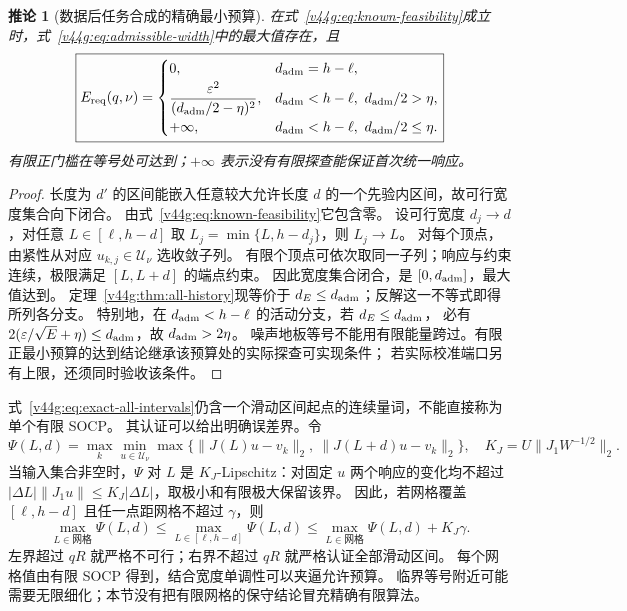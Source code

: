 \documentclass[11pt,a4paper]{article}
\numberwithin{equation}{section}
\newtheorem{corollary}[theorem]{推论}
\theoremstyle{definition}
\begin{document}
\begin{corollary}[数据后任务合成的精确最小预算]
\label{v44g:cor:energy}
在式~\eqref{v44g:eq:known-feasibility}成立时，式~\eqref{v44g:eq:admissible-width}中的最大值存在，且
\begin{equation}
 \boxed{
 E_{\rm req}(q,\nu)=
 \begin{cases}
 0,&d_{\rm adm}=h-\ell,\\[2pt]
 \displaystyle\frac{\varepsilon^2}{(d_{\rm adm}/2-\eta)^2},
   &d_{\rm adm}<h-\ell,\ d_{\rm adm}/2>\eta,\\[6pt]
 +\infty,&d_{\rm adm}<h-\ell,\ d_{\rm adm}/2\le\eta.
 \end{cases}}
 \label{v44g:eq:exact-energy}
\end{equation}
有限正门槛在等号处可达到；$+\infty$ 表示没有有限探查能保证首次统一响应。
\end{corollary}
\begin{proof}
长度为 $d'$ 的区间能嵌入任意较大允许长度 $d$ 的一个先验内区间，故可行宽度集合向下闭合。
由式~\eqref{v44g:eq:known-feasibility}它包含零。
设可行宽度 $d_j\to d$，对任意 $L\in[\ell,h-d]$ 取
$L_j=\min\{L,h-d_j\}$，则 $L_j\to L$。
对每个顶点，由紧性从对应 $u_{k,j}\in\mathcal U_\nu$ 选收敛子列。
有限个顶点可依次取同一子列；响应与约束连续，极限满足 $[L,L+d]$ 的端点约束。
因此宽度集合闭合，是 $[0,d_{\rm adm}]$，最大值达到。
定理~\ref{v44g:thm:all-history}现等价于 $d_E\le d_{\rm adm}$；反解这一不等式即得所列各分支。
特别地，在 $d_{\rm adm}<h-\ell$ 的活动分支，若 $d_E\le d_{\rm adm}$，
必有 $2(\varepsilon/\sqrt E+\eta)\le d_{\rm adm}$，故 $d_{\rm adm}>2\eta$。
噪声地板等号不能用有限能量跨过。有限正最小预算的达到结论继承该预算处的实际探查可实现条件；
若实际校准端口另有上限，还须同时验收该条件。
\end{proof}

式~\eqref{v44g:eq:exact-all-intervals}仍含一个滑动区间起点的连续量词，不能直接称为单个有限 SOCP。
其认证可以给出明确误差界。令
\begin{equation}
 \Psi(L,d)=\max_k\min_{u\in\mathcal U_\nu}
  \max\{\|J(L)u-v_k\|_2,\ \|J(L+d)u-v_k\|_2\},
 \quad K_J=U\|J_1W^{-1/2}\|_2.
 \label{v44g:eq:value-function}
\end{equation}
当输入集合非空时，$\Psi$ 对 $L$ 是 $K_J$-Lipschitz：对固定 $u$ 两个响应的变化均不超过
$|\Delta L|\|J_1u\|\le K_J|\Delta L|$，取极小和有限极大保留该界。
因此，若网格覆盖 $[\ell,h-d]$ 且任一点距网格不超过 $\gamma$，则
\begin{equation}
 \max_{L\in\text{网格}}\Psi(L,d)
 \le\max_{L\in[\ell,h-d]}\Psi(L,d)
 \le\max_{L\in\text{网格}}\Psi(L,d)+K_J\gamma.
 \label{v44g:eq:grid-certificate}
\end{equation}
左界超过 $qR$ 就严格不可行；右界不超过 $qR$ 就严格认证全部滑动区间。
每个网格值由有限 SOCP 得到，结合宽度单调性可以夹逼允许预算。
临界等号附近可能需要无限细化；本节没有把有限网格的保守结论冒充精确有限算法。
\end{document}
